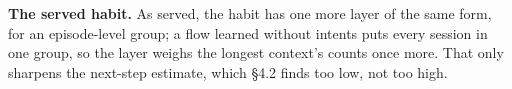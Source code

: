 \documentclass[10pt,twocolumn,letterpaper]{article}
\newcommand{\runin}[1]{{\sffamily\bfseries\color{accent}#1}}
\begin{document}
\runin{The served habit.} As served, the habit has one more layer of the same form, for an episode-level group; a flow learned without intents puts every session in one group, so the layer weighs the longest context's counts once more. That only sharpens the next-step estimate, which §4.2 finds too low, not too high.
\end{document}

